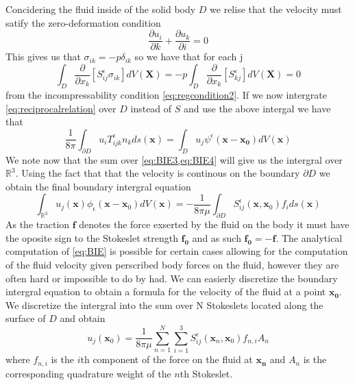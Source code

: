 Concidering the fluid inside of the solid body $D$ we relise that the velocity must satify the zero-deformation condition
\begin{equation*}
  \frac{\partial u_i}{\partial k} + \frac{\partial u_k}{\partial i} = 0
\end{equation*}
This gives us that $\sigma_{ik} = -p\delta_{ik}$ so we have that for each j
\begin{equation*}
  \int_{D} \frac{\partial}{\partial x_k}\left[S^\epsilon_{ij}\sigma_{ik}\right]dV(\mathbf{X}) = -p\int_{D} \frac{\partial}{\partial x_k}\left[S^\epsilon_{kj}\right]dV(\mathbf{X}) = 0
\end{equation*}
from the incompressability condition \cref{eq:regcondition2}. If we now intergrate \cref{eq:reciprocalrelation} over $D$ instead of $S$ and use the above intergal we have that
\begin{equation}
  \label{eq:BIE4}
\frac{1}{8\pi}\int_{\partial D} u_iT^\epsilon_{ijk}n_k ds(\mathbf{x}) = \int_D u_j \psi^\epsilon(\mathbf{x}-\mathbf{x_0}) dV(\mathbf{x})
\end{equation}
We note now that the sum over \cref{eq:BIE3,eq:BIE4} will give us the intergral over $\mathbb{R}^{3}$. Using the fact that that the velocity is continous on the boundary $\partial D$ we obtain the final boundary intergral equation
\begin{equation}
  \label{eq:BIE}
    \int_{\mathbb{R}^{3}} u_{j}(\mathbf{x}) \phi_{\epsilon}\left(\mathbf{x}-\mathbf{x}_{0}\right) d V(\mathbf{x})=-\frac{1}{8 \pi \mu} \int_{\partial D} S_{i j}^{\epsilon}\left(\mathbf{x}, \mathbf{x}_{0}\right) f_{i} d s(\mathbf{x})
\end{equation}
As the traction $\mathbf{f}$ denotes the force exserted by the fluid on the body it must have the oposite sign to the Stokeslet strength $\mathbf{f_0}$ and as such $\mathbf{f_0} = -\mathbf{f}$.
The analytical computation of \cref{eq:BIE} is possible for certain cases allowing for the computation of the fluid velocity given perscribed body forces on the fluid, however they are often hard or impossible to do by had. We can easierly discretize the boundary intergral equation to obtain a formula for the velocity of the fluid at a point $\mathbf{x_0}$. We discretize the intergral into the sum over N Stokeslets located along the surface of $D$ and obtain
\begin{equation}
\label{eq:Stokesletsum}
    u_{j}\left(\mathbf{x}_{0}\right)=\frac{1}{8 \pi \mu} \sum_{n=1}^{N} \sum_{i=1}^{3} S_{i j}^{\epsilon}\left(\mathbf{x}_{n}, \mathbf{x}_{0}\right) f_{n, i} A_{n}
\end{equation}
where $f_{n, i}$ is the $i$th component of the force on the fluid at $\mathbf{x_n}$ and $A_n$ is the corresponding quadrature weight of the $n$th Stokeslet.
